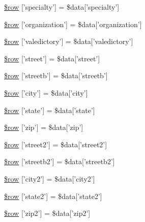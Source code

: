 \begin{DoxyCompactItemize}
\hyperlink{miscellaneous_2addressbook_2data__update_8ejs_8php_a303951ab220aee0016b1d2fe9c668eb9}{\$row} \mbox{[}'specialty'\mbox{]} = \$data\mbox{[}'specialty'\mbox{]}
\item 
\hyperlink{miscellaneous_2addressbook_2data__update_8ejs_8php_a69213631c5b3eaacd5809b9c8d3721c2}{\$row} \mbox{[}'organization'\mbox{]} = \$data\mbox{[}'organization'\mbox{]}
\item 
\hyperlink{miscellaneous_2addressbook_2data__update_8ejs_8php_a03936db500530c616c892f3db51586a9}{\$row} \mbox{[}'valedictory'\mbox{]} = \$data\mbox{[}'valedictory'\mbox{]}
\item 
\hyperlink{miscellaneous_2addressbook_2data__update_8ejs_8php_a7333deeacbe82dc6e01b7e9e86eb3e5a}{\$row} \mbox{[}'street'\mbox{]} = \$data\mbox{[}'street'\mbox{]}
\item 
\hyperlink{miscellaneous_2addressbook_2data__update_8ejs_8php_a7ad971fc709953274ddc5ebb334b2bda}{\$row} \mbox{[}'streetb'\mbox{]} = \$data\mbox{[}'streetb'\mbox{]}
\item 
\hyperlink{miscellaneous_2addressbook_2data__update_8ejs_8php_abc2948b74989328277b5513f9ba22e4e}{\$row} \mbox{[}'city'\mbox{]} = \$data\mbox{[}'city'\mbox{]}
\item 
\hyperlink{miscellaneous_2addressbook_2data__update_8ejs_8php_a652ce4ee989023692939900810b2a70a}{\$row} \mbox{[}'state'\mbox{]} = \$data\mbox{[}'state'\mbox{]}
\item 
\hyperlink{miscellaneous_2addressbook_2data__update_8ejs_8php_a43a082263bffe64821abd5386c374ea3}{\$row} \mbox{[}'zip'\mbox{]} = \$data\mbox{[}'zip'\mbox{]}
\item 
\hyperlink{miscellaneous_2addressbook_2data__update_8ejs_8php_a56dde69befd76ea6b3273932cf517c8e}{\$row} \mbox{[}'street2'\mbox{]} = \$data\mbox{[}'street2'\mbox{]}
\item 
\hyperlink{miscellaneous_2addressbook_2data__update_8ejs_8php_a8ea62ae310fd8899b5da0f1522723386}{\$row} \mbox{[}'streetb2'\mbox{]} = \$data\mbox{[}'streetb2'\mbox{]}
\item 
\hyperlink{miscellaneous_2addressbook_2data__update_8ejs_8php_aa610cd56bbcf4b9d3b2e212c30180df4}{\$row} \mbox{[}'city2'\mbox{]} = \$data\mbox{[}'city2'\mbox{]}
\item 
\hyperlink{miscellaneous_2addressbook_2data__update_8ejs_8php_a073dd913d0ed16cf9cd0044d0e0aaa6d}{\$row} \mbox{[}'state2'\mbox{]} = \$data\mbox{[}'state2'\mbox{]}
\item 
\hyperlink{miscellaneous_2addressbook_2data__update_8ejs_8php_a5d1c42367c8080fb4096e84cb9b929b1}{\$row} \mbox{[}'zip2'\mbox{]} = \$data\mbox{[}'zip2'\mbox{]}

\end{DoxyCompactItemize}

